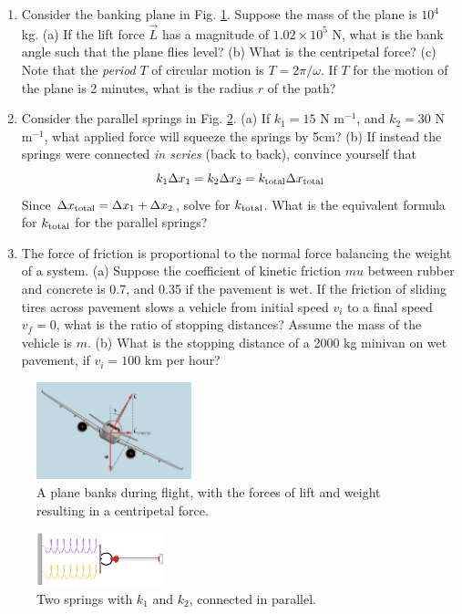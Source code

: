 \documentclass{article}
\begin{document}
\begin{enumerate}
\item Consider the banking plane in Fig. \ref{fig:1}.  Suppose the mass of the plane is $10^4$ kg.  (a) If the lift force $\vec{L}$ has a magnitude of $1.02 \times 10^5$ N, what is the bank angle such that the plane flies level? (b) What is the centripetal force? (c) Note that the \textit{period} $T$ of circular motion is $T = 2\pi/\omega$.  If $T$ for the motion of the plane is 2 minutes, what is the radius $r$ of the path? \\ \vspace{4cm}
\item Consider the parallel springs in Fig. \ref{fig:2}.  (a) If $k_1 = 15$ N m$^{-1}$, and $k_2 = 30$ N m$^{-1}$, what applied force will squeeze the springs by 5cm? (b) If instead the springs were connected \textit{in series} (back to back), convince yourself that 
\begin{equation}
k_1 \Delta x_1 = k_2 \Delta x_2 = k_{\rm total} \Delta x_{\rm total}
\end{equation}
Since $\Delta x_{\rm total} = \Delta x_1 + \Delta x_2$, solve for $k_{\rm total}$.  What is the equivalent formula for $k_{\rm total}$ for the parallel springs? \\ \vspace{4cm}
\item The force of friction is proportional to the normal force balancing the weight of a system. (a) Suppose the coefficient of kinetic friction $mu$ between rubber and concrete is 0.7, and 0.35 if the pavement is wet.  If the friction of sliding tires across pavement slows a vehicle from initial speed $v_i$ to a final speed $v_f = 0$, what is the ratio of stopping distances?  Assume the mass of the vehicle is $m$. (b) What is the stopping distance of a 2000 kg minivan on wet pavement, if $v_i = 100$ km per hour?
\end{enumerate}

\begin{figure}
\centering
\includegraphics[width=0.4\textwidth]{figures/plane.jpeg}
\caption{\label{fig:1} A plane banks during flight, with the forces of lift and weight resulting in a centripetal force.}
\end{figure}

\begin{figure}
\centering
\includegraphics[width=0.33\textwidth]{figures/parallel_springs.png}
\caption{\label{fig:2} Two springs with $k_1$ and $k_2$, connected in parallel.}
\end{figure}
\end{document}
